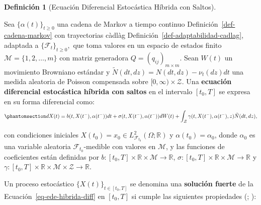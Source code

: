 \documentclass[
  spanish,
  us-letterpaper,
]{scrreprt}
\numberwithin{equation}{section}
\theoremstyle{plain}
\theoremstyle{plain}
\theoremstyle{definition}
\newtheorem{definition}{Definición}[chapter]
\theoremstyle{plain}
\theoremstyle{remark}
\begin{document}
\begin{definition}[Ecuación Diferencial Estocástica Híbrida con
Saltos]\protect\hypertarget{def-ede-hibrida}{}\label{def-ede-hibrida}

Sea \(\{\alpha(t)\}_{t \ge 0}\) una cadena de Markov a tiempo continuo
Definición~\ref{def-cadena-markov} con trayectorias càdlàg
Definición~\ref{def-adaptabilidad-cadlag}, adaptada a
\(\{\mathcal{F}_t\}_{t \ge 0},\) que toma valores en un espacio de
estados finito \(\mathcal{M} = \{1, 2, \dots, m\}\) con matriz
generadora \(Q = (q_{ij})_{m \times m}.\) Sean \(W(t)\) un movimiento
Browniano estándar y \(\tilde{N}(dt, dz) = N(dt, dz) - \nu_t(dz)dt\) una
medida aleatoria de Poisson compensada sobre
\([0, \infty) \times \mathcal{Z}.\) Una \textbf{ecuación diferencial
estocástica híbrida con saltos} en el intervalo \([t_0, T]\) se expresa
en su forma diferencial como:
\begin{equation}\phantomsection\label{eq-ede-hibrida-diff}{
dX(t) = b(t, X(t^-), \alpha(t^-)) dt + \sigma(t, X(t^-), \alpha(t^-)) dW(t) + \int_{\mathcal{Z}} \gamma(t, X(t^-), \alpha(t^-), z) \tilde{N}(dt, dz),
}\end{equation}

con condiciones iniciales
\(X(t_0) = x_0 \in L^2_{\mathcal{F}_{t_0}}(\Omega; \mathbb{R})\) y
\(\alpha(t_0) = \alpha_0\), donde \(\alpha_0\) es una variable aleatoria
\(\mathcal{F}_{t_0}\)-medible con valores en \(\mathcal{M}\), y las
funciones de coeficientes están definidas por
\(b: [t_0, T] \times \mathbb{R} \times \mathcal{M} \to \mathbb{R}\),
\(\sigma: [t_0, T] \times \mathbb{R} \times \mathcal{M} \to \mathbb{R}\)
y
\(\gamma: [t_0, T] \times \mathbb{R} \times \mathcal{M} \times \mathcal{Z} \to \mathbb{R}\).

Un proceso estocástico \(\{X(t)\}_{t \in [t_0, T]}\) se denomina una
\textbf{solución fuerte} de la Ecuación~\ref{eq-ede-hibrida-diff} en
\([t_0, T]\) si cumple las siguientes propiedades
(;
):


\end{definition}
\end{document}
